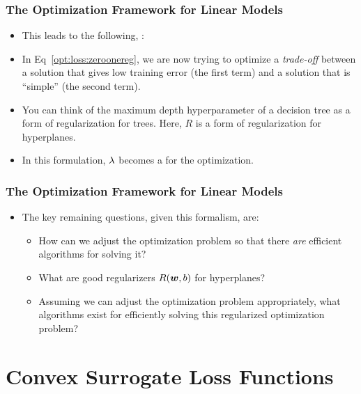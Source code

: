 \documentclass[trans]{beamer}
\begin{document}
\begin{frame}
  \frametitle{The Optimization Framework for Linear Models}
\begin{itemize}
\item 
This leads to the following, :
%
%
\item
In Eq~\eqref{opt:loss:zeroonereg}, we are now trying to optimize a
\emph{trade-off} between a solution that gives low training error (the
first term) and a solution that is ``simple'' (the second term). 
\item You
can think of the maximum depth hyperparameter of a decision tree as a
form of regularization for trees.  Here, $R$ is a form of
regularization for hyperplanes.  
\item In this formulation, $\lambda$ becomes a
 for the optimization.
\end{itemize}
\end{frame}


\begin{frame}
  \frametitle{The Optimization Framework for Linear Models}
\begin{itemize}
\item 
The key remaining questions, given this formalism, are:
\begin{itemize}
\item How can we adjust the optimization problem so that there
  \emph{are} efficient algorithms for solving it?
\item What are good regularizers $R({\boldsymbol{w}},b)$ for hyperplanes?
\item Assuming we can adjust the optimization problem appropriately,
  what algorithms exist for efficiently solving this regularized
  optimization problem?
\end{itemize}
\end{itemize}
\end{frame}

\section{Convex Surrogate Loss Functions}
\end{document}
